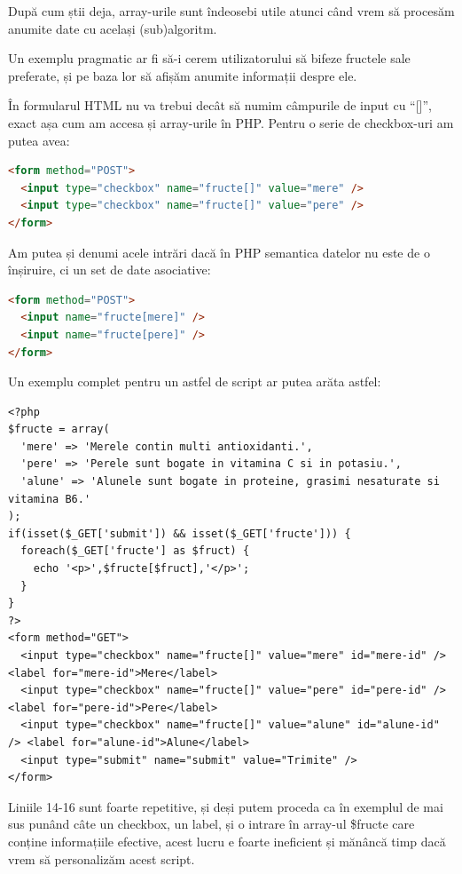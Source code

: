 După cum știi deja, array-urile sunt îndeosebi utile atunci când vrem să procesăm anumite date
cu același (sub)algoritm.

Un exemplu pragmatic ar fi să-i cerem utilizatorului să bifeze fructele sale preferate,
și pe baza lor să afișăm anumite informații despre ele.

În formularul HTML nu va trebui decât să numim câmpurile de input cu ``[]'', exact așa cum
am accesa și array-urile în PHP. Pentru o serie de checkbox-uri am putea avea:
\begin{lstlisting}[language=HTML]
<form method="POST">
  <input type="checkbox" name="fructe[]" value="mere" />
  <input type="checkbox" name="fructe[]" value="pere" />
</form>
\end{lstlisting}
Am putea și denumi acele intrări dacă în PHP semantica datelor nu este
de o înșiruire, ci un set de date asociative:
\begin{lstlisting}[language=HTML]
<form method="POST">
  <input name="fructe[mere]" />
  <input name="fructe[pere]" />
</form>
\end{lstlisting}

Un exemplu complet pentru un astfel de script ar putea arăta astfel:
\begin{lstlisting}[label=lst:favourite-fruits,caption={Fructe favorite}]
<?php
$fructe = array(
  'mere' => 'Merele contin multi antioxidanti.',
  'pere' => 'Perele sunt bogate in vitamina C si in potasiu.',
  'alune' => 'Alunele sunt bogate in proteine, grasimi nesaturate si vitamina B6.'
);
if(isset($_GET['submit']) && isset($_GET['fructe'])) {
  foreach($_GET['fructe'] as $fruct) {
	echo '<p>',$fructe[$fruct],'</p>';
  }
}
?>
<form method="GET">
  <input type="checkbox" name="fructe[]" value="mere" id="mere-id" /> <label for="mere-id">Mere</label>
  <input type="checkbox" name="fructe[]" value="pere" id="pere-id" /> <label for="pere-id">Pere</label>
  <input type="checkbox" name="fructe[]" value="alune" id="alune-id" /> <label for="alune-id">Alune</label>
  <input type="submit" name="submit" value="Trimite" />
</form>
\end{lstlisting}

Liniile 14-16 sunt foarte repetitive, și deși putem proceda ca în exemplul de mai sus punând câte un
checkbox, un label, și o intrare în array-ul \$fructe care conține informațiile efective, acest lucru e foarte
ineficient și mănâncă timp dacă vrem să personalizăm acest script.


